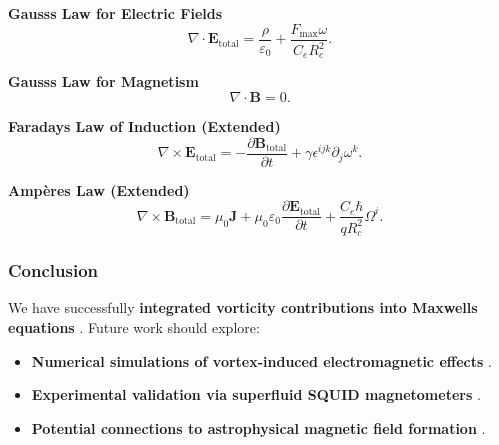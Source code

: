 \textbf{Gauss\rqs s Law for Electric Fields}
\begin{equation*}
    \nabla \cdot \mathbf{E}_\text{total} = \frac{\rho}{\varepsilon_0} + \frac{F_{\max} \omega}{C_e R_c^2}.
\end{equation*}

\textbf{Gauss\rqs s Law for Magnetism}
\begin{equation*}
    \nabla \cdot \mathbf{B} = 0.
\end{equation*}

\textbf{Faraday\rqs s Law of Induction (Extended)}
\begin{equation*}
    \nabla \times \mathbf{E}_\text{total} = - \frac{\partial \mathbf{B}_\text{total}}{\partial t} + \gamma \epsilon^{ijk} \partial_j \omega^k.
\end{equation*}

\textbf{Ampère\rqs s Law (Extended)}
\begin{equation*}
    \nabla \times \mathbf{B}_\text{total} = \mu_0 \mathbf{J} + \mu_0 \varepsilon_0 \frac{\partial \mathbf{E}_\text{total}}{\partial t} + \frac{C_e \hbar}{q R_c^2} \Omega^i.
\end{equation*}

\subsubsection*{Conclusion}
We have successfully \textbf{integrated vorticity contributions into Maxwell\rqs s equations} . Future work should explore:
\begin{itemize}
    \item \textbf{Numerical simulations of vortex-induced electromagnetic effects} .
    \item \textbf{Experimental validation via superfluid SQUID magnetometers} .
    \item \textbf{Potential connections to astrophysical magnetic field formation} .
\end{itemize}

